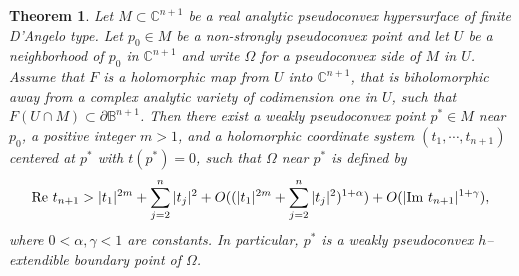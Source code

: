 \documentclass[a4paper,centertags,oneside,12pt]{amsart}
\newtheorem{theorem}{Theorem}[section]
\numberwithin{equation}{section}
\begin{document}
\begin{theorem}\label{thm1-2-23} Let $M\subset\mathbb C^{n+1}$ be a real analytic pseudoconvex hypersurface of finite D'Angelo type. Let $p_0\in M$ be a non-strongly pseudoconvex  point and let $U$ be a neighborhood of $p_0$ in $\mathbb C^{n+1}$ and write $\Omega$ for a pseudoconvex side of $M$ in $U$. Assume that $F$ is a holomorphic map from $U$ into $\mathbb C^{n+1}$, that is biholomorphic away from a complex analytic variety of codimension one  in $U$, such that $F(U\cap M)\subset \partial {\mathbb B}^{n+1}$. 
Then there exist a weakly pseudoconvex point $p^\ast\in M$ near $p_0$, a positive integer $m>1$, and a  holomorphic coordinate system  $(t_1, \cdots, t_{n+1})$ centered  at $p^\ast$ with $t(p^*)=0$, such that $\Omega$ near $p^\ast$ is defined by 
\begin{equation*}
    {\rm Re} ~t_{n+1}>|t_1|^{2m}+\sum_{j=2}^{n}|t_j|^2+ O((|t_1|^{2m}+\sum_{j=2}^{n}|t_j|^2)^{1+\alpha})+O(|{\rm{Im}}~ t_{n+1}|^{1+\gamma}),
\end{equation*}
where $0<\alpha, \gamma<1$ are constants.
In particular, $p^*$ is a weakly pseudoconvex $h$--extendible boundary point of $\Omega$.
\end{theorem}
\end{document}
